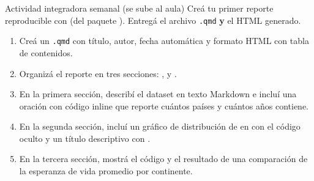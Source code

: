 \documentclass[8pt]{beamer}
\begin{document}
	\begin{frame}[fragile]{Actividad integradora semanal (se sube al aula)}
		Creá tu primer reporte reproducible con  (del paquete ). Entregá el archivo \texttt{.qmd} \textbf{y} el HTML generado.

		\begin{enumerate}
			\item Creá un \texttt{.qmd} con título, autor, fecha automática y formato HTML con tabla de contenidos.

			\item Organizá el reporte en tres secciones: ,  y .

			\item En la primera sección, describí el dataset en texto Markdown e incluí una oración con código inline que reporte cuántos países y cuántos años contiene.

			\item En la segunda sección, incluí un gráfico de distribución de  en  con el código oculto y un título descriptivo con .

			\item En la tercera sección, mostrá el código y el resultado de una comparación de la esperanza de vida promedio por continente.
		\end{enumerate}
	\end{frame}
\end{document}
